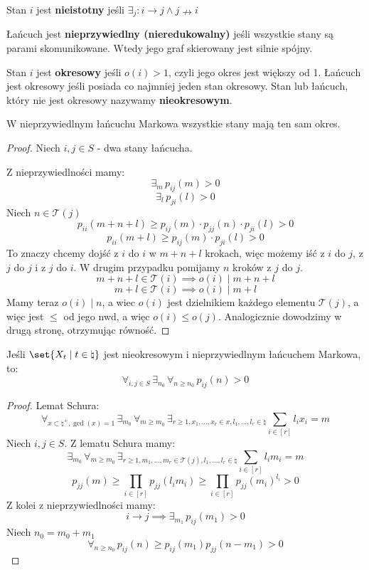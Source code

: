 \begin{definition}
	Stan \( i \) jest \textbf{nieistotny} jeśli \( \exists_j : i \rightarrow j \land j \nrightarrow i \)
\end{definition}

\begin{definition}
	Łańcuch jest \textbf{nieprzywiedlny (nieredukowalny)} jeśli wszystkie stany są parami skomunikowane. Wtedy jego graf skierowany jest silnie spójny.
\end{definition}

\begin{definition}
	Stan \(i\) jest \textbf{okresowy} jeśli \( o(i) > 1 \), czyli jego okres jest większy od 1.
	Łańcuch jest okresowy jeśli posiada co najmniej jeden stan okresowy.
	Stan lub łańcuch, który nie jest okresowy nazywamy \textbf{nieokresowym}.
\end{definition}

\begin{lemma}
	W nieprzywiedlnym łańcuchu Markowa wszystkie stany mają ten sam okres.
\end{lemma}
\begin{proof}
	Niech \( i, j \in S \) - dwa stany łańcucha.

	Z nieprzywiedlności mamy:
	\[
		\exists_m \, p_{ij}(m) > 0
	\]
	\[
		\exists_l \, p_{ji}(l) > 0
	\]
	Niech \( n \in \mathcal{T}(j) \)
	\[
		p_{ii}(m + n + l) \geq p_{ij}(m) \cdot p_{jj}(n) \cdot p_{ji}(l) > 0
	\]
	\[
		p_{ii}(m + l) \geq p_{ij}(m) \cdot p_{ji}(l) > 0
	\]
	To znaczy chcemy dojść z \( i \) do \( i \) w \(m + n + l\) krokach, więc możemy iść z \( i \) do \( j \), z \( j \) do \( j \) i z \( j \) do \( i \). W drugim przypadku pomijamy \( n \) kroków z \( j \) do \( j \).
	\[
		m+n+l \in \mathcal{T}(i) \implies o(i) \mid m+n+l
	\]
	\[
		m+l \in \mathcal{T}(i) \implies o(i) \mid m+l
	\]
	Mamy teraz \(o(i) \mid n\), a wiec \(o(i)\) jest dzielnikiem każdego elementu \(\mathcal{T}(j)\), a więc jest \(\leq\) od jego nwd, a więc \(o(i) \leq o(j)\). Analogicznie dowodzimy w drugą stronę, otrzymując równość.
\end{proof}

\begin{lemma}
	Jeśli \( \set{ X_t \mid t \in \natural } \) jest nieokresowym i nieprzywiedlnym łańcuchem Markowa, to:
	\[
		\forall_{i, j \in S} \, \exists_{n_0} \, \forall_{n \geq n_0} \, p_{ij}(n) > 0
	\]
\end{lemma}
\begin{proof}
	Lemat Schura:
	\[
		\forall_{x \subset \natural^+, \gcd(x) = 1} \, \exists_{m_0} \, \forall_{m \geq m_0} \,
		\exists_{r \geq 1, x_1, \ldots, x_r \in x, l_1, \ldots, l_r \in \natural} \sum_{i \in [r]}l_ix_i = m
	\]
	Niech \( i, j \in S \). Z lematu Schura mamy:
	\[
		\exists_{m_0} \, \forall_{m \geq m_0} \, \exists_{r \geq 1, m_1, \ldots, m_r \in \mathcal{T}(j), l_1, \ldots, l_r \in \natural} \sum_{i \in [r]} l_im_i = m
	\]
	\[
		p_{jj}(m) \geq \prod_{i \in [r]}p_{jj}(l_im_i) \geq \prod_{i \in [r]} p_{jj}(m_i)^{l_i} > 0
	\]
	Z kolei z nieprzywiedlności mamy:
	\[
		i \rightarrow j \implies \exists_{m_1} \, p_{ij}(m_1) > 0
	\]
	Niech \( n_0 = m_0 + m_1 \)
	\[
		\forall_{n \geq n_0} \, p_{ij}(n) \geq p_{ij}(m_1)p_{jj}(n-m_1) > 0
	\]
\end{proof}

